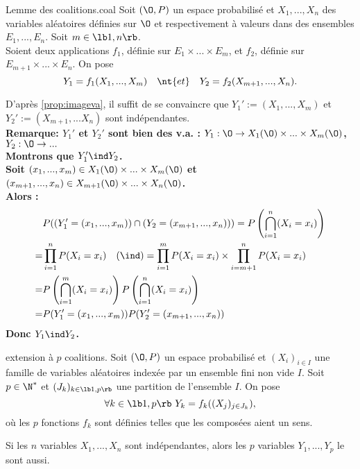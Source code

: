 \documentclass[11pt]{article}
\begin{document}
\begin{prop}{Lemme des coalitions.}{coal}
    Soit $(\O,P)$ un espace probabilisé et $X_1,...,X_n$ des variables aléatoires définies sur $\O$ et respectivement à valeurs dans des ensembles $E_1,...,E_n$. Soit $m\in\lb1,n\rb$.\\
    Soient deux applications $f_1$, définie sur $E_1\times...\times E_m$, et $f_2$, définie sur $E_{m+1}\times...\times E_n$. On pose
    \begin{equation*}
        Y_1=f_1(X_1,...,X_m) \quad \nt{ et } \quad Y_2 = f_2(X_{m+1},...,X_n).
    \end{equation*}
    \begin{center}
    \end{center}
    \tcblower
    D'après \ref{prop:imageva}, il suffit de se convaincre que $Y_1':=(X_1,...,X_m)$ et $Y_2':=(X_{m+1},...X_n)$ sont indépendantes.\\
    \bf{Remarque:} $Y_1'$ et $Y_2'$ sont bien des v.a. : $Y_1:\O\to X_1(\O)\times...\times X_m(\O)$, $Y_2:\O\to...$\\
    Montrons que $Y_1' \ind Y_2$.\\
    Soit $(x_1,...,x_m)\in X_1(\O)\times...\times X_m(\O)$ et $(x_{m+1},...,x_n)\in X_{m+1}(\O)\times...\times X_n(\O)$.\\
    Alors :
    \begin{align*}
        &P((Y_1'=(x_1,...,x_m))\cap(Y_2=(x_{m+1},...,x_n))) = P\left( \bigcap_{i=1}^n(X_i=x_i) \right)\\
        =&\prod_{i=1}^nP(X_i=x_i) \quad (\ind) = \prod_{i=1}^mP(X_i=x_i)\times\prod_{i=m+1}^n P(X_i=x_i)\\
        =&P\left( \bigcap_{i=1}^m(X_i=x_i) \right)P\left( \bigcap_{i=1}^n(X_i=x_i) \right)\\
        =&P(Y_1'=(x_1,...,x_m))P(Y_2'=(x_{m+1},...,x_n))
    \end{align*}
    Donc $Y_1 \ind Y_2$.
\end{prop}

\begin{prop}{extension à $p$ coalitions.}
    Soit $(\O,P)$ un espace probabilisé et $(X_i)_{i\in I}$ une famille de variables aléatoires indexée par un ensemble fini non vide $I$. Soit $p\in\N^*$ et $(J_k)_{k\in\lb1,p\rb}$ une partition de l'ensemble $I$. On pose
    \begin{equation*}
        \forall k\in\lb1,p\rb ~ Y_k=f_k((X_j)_{j\in J_k}),
    \end{equation*}
    où les $p$ fonctions $f_k$ sont définies telles que les composées aient un sens.
    \begin{center}
        Si les $n$ variables $X_1,...,X_n$ sont indépendantes, alors les $p$ variables $Y_1,...,Y_p$ le sont aussi.
    \end{center}
\end{prop}
\end{document}
